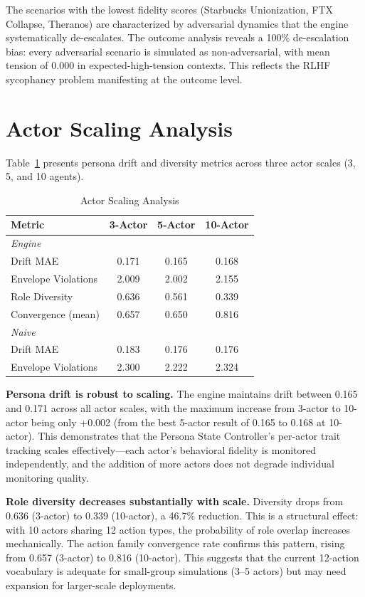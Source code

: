 The scenarios with the lowest fidelity scores (Starbucks Unionization, FTX Collapse, Theranos) are characterized by adversarial dynamics that the engine systematically de-escalates. The outcome analysis reveals a 100\% de-escalation bias: every adversarial scenario is simulated as non-adversarial, with mean tension of 0.000 in expected-high-tension contexts. This reflects the RLHF sycophancy problem manifesting at the outcome level.


\section{Actor Scaling Analysis}

Table~\ref{tab:scaling} presents persona drift and diversity metrics across three actor scales (3, 5, and 10 agents).

\begin{table}[t]
\centering
\caption{Actor Scaling Analysis}
\label{tab:scaling}
\begin{tabular}{lccc}
\toprule
Metric & 3-Actor & 5-Actor & 10-Actor \\
\midrule
\multicolumn{4}{l}{\textit{Engine}} \\
Drift MAE          & 0.171 & 0.165 & 0.168 \\
Envelope Violations & 2.009 & 2.002 & 2.155 \\
Role Diversity      & 0.636 & 0.561 & 0.339 \\
Convergence (mean)  & 0.657 & 0.650 & 0.816 \\
\midrule
\multicolumn{4}{l}{\textit{Naive}} \\
Drift MAE          & 0.183 & 0.176 & 0.176 \\
Envelope Violations & 2.300 & 2.222 & 2.324 \\
\bottomrule
\end{tabular}
\end{table}

\textbf{Persona drift is robust to scaling.} The engine maintains drift between 0.165 and 0.171 across all actor scales, with the maximum increase from 3-actor to 10-actor being only +0.002 (from the best 5-actor result of 0.165 to 0.168 at 10-actor). This demonstrates that the Persona State Controller's per-actor trait tracking scales effectively---each actor's behavioral fidelity is monitored independently, and the addition of more actors does not degrade individual monitoring quality.

\textbf{Role diversity decreases substantially with scale.} Diversity drops from 0.636 (3-actor) to 0.339 (10-actor), a 46.7\% reduction. This is a structural effect: with 10 actors sharing 12 action types, the probability of role overlap increases mechanically. The action family convergence rate confirms this pattern, rising from 0.657 (3-actor) to 0.816 (10-actor). This suggests that the current 12-action vocabulary is adequate for small-group simulations (3--5 actors) but may need expansion for larger-scale deployments.


